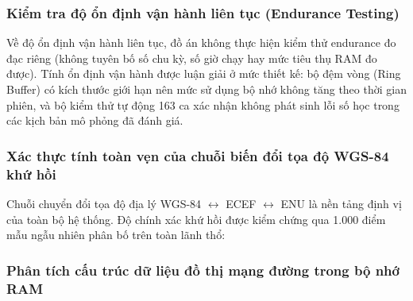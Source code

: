 \subsubsection{Kiểm tra độ ổn định vận hành liên tục (Endurance Testing)}

Về độ ổn định vận hành liên tục, đồ án không thực hiện kiểm thử endurance đo đạc riêng (không tuyên bố số chu kỳ, số giờ chạy hay mức tiêu thụ RAM đo được). Tính ổn định vận hành được luận giải ở mức thiết kế: bộ đệm vòng (Ring Buffer) có kích thước giới hạn nên mức sử dụng bộ nhớ không tăng theo thời gian phiên, và bộ kiểm thử tự động 163 ca xác nhận không phát sinh lỗi số học trong các kịch bản mô phỏng đã đánh giá.

\subsubsection{Xác thực tính toàn vẹn của chuỗi biến đổi tọa độ WGS-84 khứ hồi}

\hspace{0.5cm} Chuỗi chuyển đổi tọa độ địa lý WGS-84 $\leftrightarrow$ ECEF $\leftrightarrow$ ENU là nền tảng định vị của toàn bộ hệ thống. Độ chính xác khứ hồi được kiểm chứng qua 1.000 điểm mẫu ngẫu nhiên phân bố trên toàn lãnh thổ:

\begin{table}[H]
\centering
\caption{Kết quả kiểm chứng độ chính xác khứ hồi của chuỗi biến đổi tọa độ trắc địa}
\label{tab:geodetic-roundtrip-precision}
\end{table}

\subsubsection{Phân tích cấu trúc dữ liệu đồ thị mạng đường trong bộ nhớ RAM}

